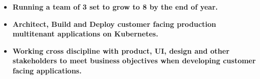 \documentclass[10pt,a4paper]{altacv}
\begin{document}


\begin{fullwidth}
\makecvheader
\end{fullwidth}



  \begin{itemize}
    \item \textbf{Running a team of 3 set to grow to 8 by the end of year.}
  \end{itemize}
  \begin{itemize}
    \item \textbf{Architect, Build and Deploy customer facing production multitenant applications on Kubernetes.}
  \end{itemize}
  \begin{itemize}
    \item \textbf{Working cross discipline with product, UI, design and other stakeholders to meet business objectives when developing customer facing applications.}
  \end{itemize}
\end{document}
